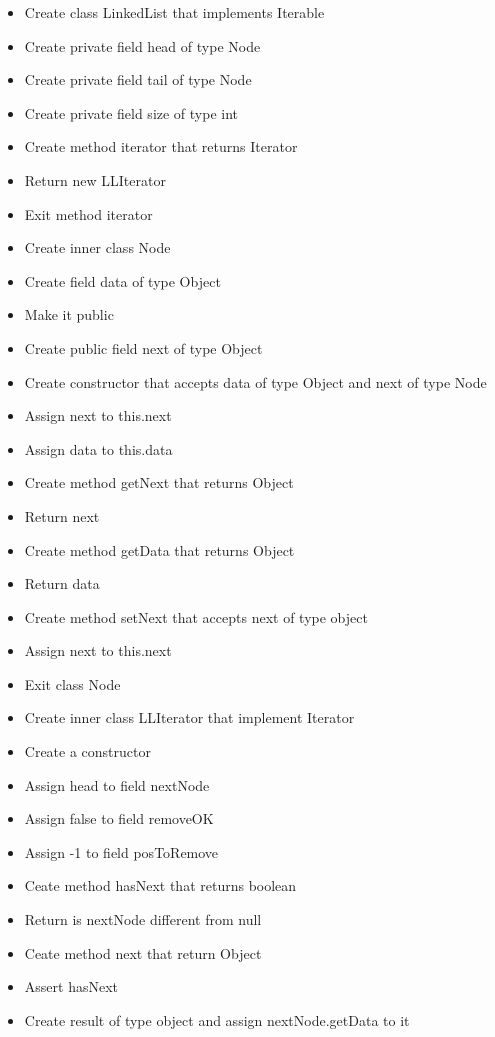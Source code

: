 \begin{itemize} \label{itemize:LinkedList Dictation}
	\item Create class LinkedList that implements Iterable
	\item Create private field head of type Node
	\item Create private field tail of type Node
	\item Create private field size of type int
	\item Create method iterator that returns Iterator
	\item Return new LLIterator
	\item Exit method iterator
	\item Create inner class Node
	\item Create field data of type Object
	\item Make it public
	\item Create public field next of type Object
	\item Create constructor that accepts data of type Object and next of type Node
	\item Assign next to this.next
	\item Assign data to this.data
	\item Create method getNext that returns Object
	\item Return next
	\item Create method getData that returns Object
	\item Return data
	\item Create method setNext that accepts next of type object
	\item Assign next to this.next
	\item Exit class Node
	\item Create inner class LLIterator that implement Iterator
	\item Create a constructor
	\item Assign head to field nextNode	
	\item Assign false to field removeOK
	\item Assign -1 to field posToRemove
	\item Ceate method hasNext that returns boolean
	\item Return is nextNode different from null
	\item Ceate method next that return Object
	\item Assert hasNext
	\item Create result of type object and assign nextNode.getData to it

\end{itemize}
